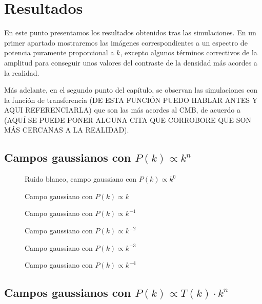 \chapter{Resultados}
En este punto presentamos los resultados obtenidos tras las simulaciones. En un primer apartado mostraremos las imágenes correspondientes a un espectro de potencia puramente proporcional a \(k\), excepto algunos términos correctivos de la amplitud para conseguir unos valores del contraste de la densidad más acordes a la realidad.

Más adelante, en el segundo punto del capítulo, se observan las simulaciones con la función de transferencia (DE ESTA FUNCIÓN PUEDO HABLAR ANTES Y AQUI REFERENCIARLA) que son las más acordes al CMB, de acuerdo a (AQUÍ SE PUEDE PONER ALGUNA CITA QUE CORROBORE QUE SON MÁS CERCANAS A LA REALIDAD).
\section{Campos gaussianos con \texorpdfstring{\(P(k)\propto k^n\)}{espectro de potencias proporcional a una potencia de k}}
\begin{figure}
  \centering
  {}
  \caption{Ruido blanco, campo gaussiano con \(P(k)\propto k^0\)}
  \label{fig::k0}
\end{figure}
\begin{figure}
  \centering
  {}
  \caption{Campo gaussiano con \(P(k)\propto k\)}
  \label{fig::k1}
\end{figure}
\begin{figure}
  \centering
  {}
  \caption{Campo gaussiano con \(P(k)\propto k^{-1}\)}
  \label{fig::kmenos1}
\end{figure}
\begin{figure}
  \centering
  {}
  \caption{Campo gaussiano con \(P(k)\propto k^{-2}\)}
  \label{fig::kmenos2}
\end{figure}
\begin{figure}
  \centering
  {}
  \caption{Campo gaussiano con \(P(k)\propto k^{-3}\)}
  \label{fig::kmenos3}
\end{figure}
\begin{figure}
  \centering
  {}
  \caption{Campo gaussiano con \(P(k)\propto k^{-4}\)}
  \label{fig::kmenos4}
\end{figure}
\cleardoublepage
\section{Campos gaussianos con \texorpdfstring{\(P(k)\propto T(k)\cdot k^n\)}{espectro de potencias del CMB}}
